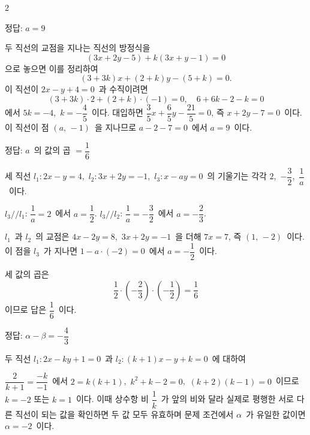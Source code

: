 \documentclass[10pt,fleqn]{article}
\begin{document}
\dmsoltitlefirsttrue
\begin{multicols*}{2}

\begin{dmanswerbox}
정답: $a=9$
\end{dmanswerbox}

두 직선의 교점을 지나는 직선의 방정식을
\[ (3x + 2y - 5) + k(3x + y - 1) = 0 \]
으로 놓으면 이를 정리하여
\[ (3 + 3k)x + (2 + k)y - (5 + k) = 0. \] 이 직선이 $2x - y + 4 = 0$\ 과 수직이려면
\[ (3 + 3k) \cdot 2 + (2 + k) \cdot (-1) = 0,\quad 6 + 6k - 2 - k = 0 \]
에서 $5k = -4$,\ $k = -\dfrac{4}{5}$\ 이다. 대입하면 $\dfrac{3}{5}x + \dfrac{6}{5}y - \dfrac{21}{5} = 0$, 즉 $x + 2y - 7 = 0$\ 이다. 이 직선이 점 $(a,\, -1)$\ 을 지나므로 $a - 2 - 7 = 0$\ 에서 $a = 9$\ 이다.
\begin{dmanswerbox}
정답: $a$\ 의 값의 곱 $= \dfrac{1}{6}$
\end{dmanswerbox}

세 직선 $l_1 : 2x - y = 4$,\ $l_2 : 3x + 2y = -1$,\ $l_3 : x - ay = 0$\ 의 기울기는 각각 $2$,\ $-\dfrac{3}{2}$,\ $\dfrac{1}{a}$\ 이다.

 $l_3 \mathbin{/\!/} l_1$: $\dfrac{1}{a} = 2$\ 에서 $a = \dfrac{1}{2}$. $l_3 \mathbin{/\!/} l_2$: $\dfrac{1}{a} = -\dfrac{3}{2}$\ 에서 $a = -\dfrac{2}{3}$.

 $l_1$\ 과 $l_2$\ 의 교점은 $4x - 2y = 8$,\ $3x + 2y = -1$\ 을 더해 $7x = 7$, 즉 $(1,\, -2)$\ 이다. 이 점을 $l_3$\ 가 지나면 $1 - a \cdot (-2) = 0$\ 에서 $a = -\dfrac{1}{2}$\ 이다.

세 값의 곱은
\[ \dfrac{1}{2} \cdot \left( -\dfrac{2}{3} \right) \cdot \left( -\dfrac{1}{2} \right) = \dfrac{1}{6} \]
이므로 답은 $\dfrac{1}{6}$\ 이다.
\begin{dmanswerbox}
정답: $\alpha-\beta=-\dfrac{4}{3}$
\end{dmanswerbox}

두 직선 $l_1 : 2x - ky + 1 = 0$\ 과 $l_2 : (k+1)x - y + k = 0$\ 에 대하여

 $\dfrac{2}{k+1} = \dfrac{-k}{-1}$\ 에서 $2 = k(k+1)$,\ $k^2 + k - 2 = 0$,\ $(k+2)(k-1) = 0$\ 이므로 $k = -2$ 또는 $k = 1$\ 이다. 이때 상수항 비 $\dfrac{1}{k}$\ 가 앞의 비와 달라 실제로 평행한 서로 다른 직선이 되는 값을 확인하면 두 값 모두 유효하며 문제 조건에서 $\alpha$\ 가 유일한 값이면 $\alpha = -2$\ 이다.


\end{multicols*}
\end{document}
